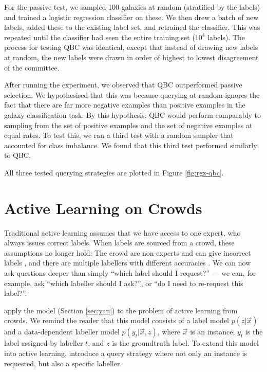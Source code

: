     For the passive test, we sampled 100 galaxies at random (stratified by the
    labels) and trained a logistic regression classifier on these. We then drew
    a batch of new labels, added these to the existing label set, and retrained
    the classifier. This was repeated until the classifier had seen the entire
    training set ($10^4$ labels). The process for testing QBC was identical,
    except that instead of drawing new labels at random, the new labels were
    drawn in order of highest to lowest disagreement of the committee.

    After running the experiment, we observed that QBC outperformed passive
    selection. We hypothesised that this was because querying at random ignores
    the fact that there are far more negative examples than positive examples in
    the galaxy classification task. By this hypothesis, QBC would perform
    comparably to sampling from the set of positive examples and the set of
    negative examples at equal rates. To test this, we ran a third test with a
    random sampler that accounted for class imbalance. We found that this third
    test performed similarly to QBC.

    All three tested querying strategies are plotted in Figure
    \ref{fig:rgz-qbc}.

\section{Active Learning on Crowds}
\label{sec:active-learning-on-crowds}
    
    Traditional active learning assumes that we have access to one expert, who
    always issues correct labels. When labels are sourced from a crowd, these
    assumptions no longer hold: The crowd are non-experts and can give incorrect
    labels \citep{mozafari12,yan11}, and there are multiple labellers with
    different accuracies \citep{yan11}. We can now ask questions deeper than
    simply ``which label should I request?'' --- we can, for example, ask
    ``which labeller should I ask?'', or ``do I need to re-request this
    label?''.

    \citet{yan11} apply the \citet{yan10} model (Section \ref{sec:yan}) to the
    problem of active learning from crowds. We remind the reader that this model
    consists of a label model $p(z | \vec x)$ and a data-dependent labeller
    model $p(y_t | \vec x, z)$, where $\vec x$ is an instance, $y_t$ is the
    label assigned by labeller $t$, and $z$ is the groundtruth label. To extend
    this model into active learning, \citeauthor{yan11} introduce a query
    strategy where not only an instance is requested, but also a specific
    labeller.

